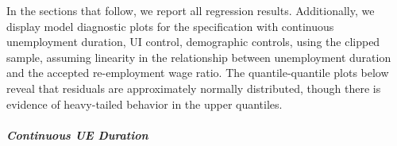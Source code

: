 \documentclass[
]{article}
\begin{document}
In the sections that follow, we report all regression results.
Additionally, we display model diagnostic plots for the specification
with continuous unemployment duration, UI control, demographic controls,
using the clipped sample, assuming linearity in the relationship between
unemployment duration and the accepted re-employment wage ratio. The
quantile-quantile plots below reveal that residuals are approximately
normally distributed, though there is evidence of heavy-tailed behavior
in the upper quantiles.

\FloatBarrier

\subparagraph{Continuous UE Duration}\label{continuous-ue-duration}

\begin{table}
\centering\centering
\caption{\label{tab:disc_reg2}Continuous Unemployment Duration: Linear Specifications, No Wage Control (Clipped Sample)}
\centering
{}
\end{table}
\end{document}
